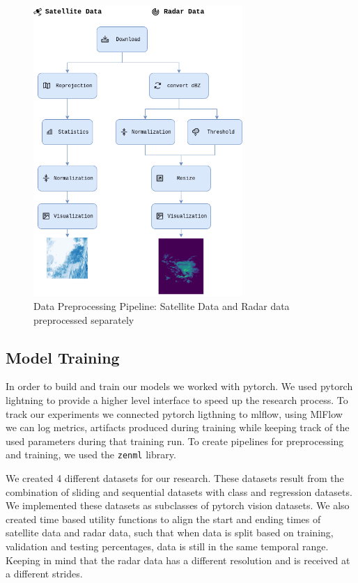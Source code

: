 \begin{figure}
  \centering
  \includegraphics[width=225pt]{./images/prepro.png}
  \caption{Data Preprocessing Pipeline: Satellite Data and Radar data preprocessed separately}
  \label{fig:preprocessing}
\end{figure}

\subsection{Model Training}
In order to build and train our models we worked with pytorch. We used pytorch lightning to provide a higher level interface to speed up the research process. To track our experiments we connected pytorch ligthning to mlflow, using MlFlow we can log metrics, artifacts produced during training while keeping track of the used parameters during that training run.
To create pipelines for preprocessing and training, we used the \texttt{zenml} library.

We created 4 different datasets for our research. These datasets result from the combination of sliding and sequential datasets with class and regression datasets.
We implemented these datasets as subclasses of pytorch vision datasets. We also created time based utility functions to align the start and ending times of satellite data and radar data, such that when data is split based on training, validation and testing percentages, data is still in the same temporal range. Keeping in mind that the radar data has a different resolution and is received at a different strides.

